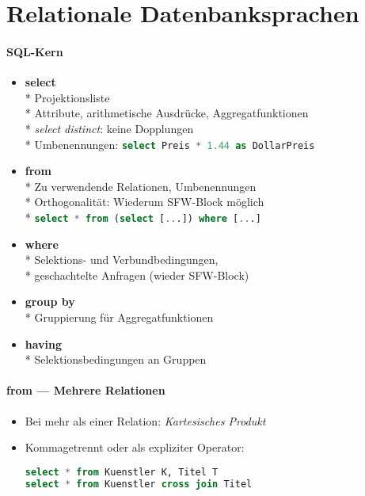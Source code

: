 \section{Relationale Datenbanksprachen}
\label{sec:sql}

\paragraph{SQL-Kern}
\begin{itemize}
	\item \textbf{select} \\*
		Projektionsliste \\*
		Attribute, arithmetische Ausdrücke, Aggregatfunktionen \\*
		\emph{select distinct}: keine Dopplungen\\*
		Umbenennungen: \lstinline[language=sql]{select Preis * 1.44 as DollarPreis }
	\item \textbf{from} \\*
		Zu verwendende Relationen, Umbenennungen\\*
		Orthogonalität: Wiederum SFW-Block möglich\\*
		\lstinline[language=sql]{select * from (select [...]) where [...] }
	\item \textbf{where} \\*
		Selektions- und Verbundbedingungen, \\*
		geschachtelte Anfragen (wieder SFW-Block)
	\item \textbf{group by} \\*
		Gruppierung für Aggregatfunktionen
	\item \textbf{having} \\*
		Selektionsbedingungen an Gruppen
\end{itemize}

\paragraph{from --- Mehrere Relationen}
\begin{itemize}
	\item Bei mehr als einer Relation: \emph{Kartesisches Produkt}
	\item Kommagetrennt oder als expliziter Operator:
	\begin{lstlisting}[language=sql]
select * from Kuenstler K, Titel T
select * from Kuenstler cross join Titel
	\end{lstlisting}
\end{itemize}

